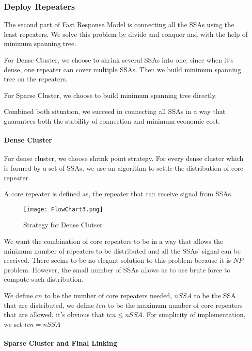 \documentclass[../main]{subfiles}
\begin{document}
\subsubsection{Deploy Repeaters}

The second part of Fast Response Model is connecting all the SSAs using
the least repeaters. We solve this problem by divide and conquer and
with the help of minimum spanning tree.

For Dense Cluster, we choose to shrink several SSAs into one, since when
it's dense, one repeater can cover multiple SSAs. Then we build minimum
spanning tree on the repeaters.

For Sparse Cluster, we choose to build minimum spanning tree directly.

Combined both situation, we succeed in connecting all SSAs in a way that
guarantees both the stability of connection and minimum economic cost.

\paragraph{Dense Cluster}

For dense cluster, we choose shrink point strategy. For every dense
cluster which is formed by a set of SSAs, we use an algorithm to settle
the distribution of core repeater.

A core repeater is defined as, the repeater that can receive signal from
SSAs.

\begin{figure}[h!]
      \texttt{[image: FlowChart3.png]}
      \caption{Strategy for Dense Clutser}
    \end{figure}

We want the combination of core repeaters to be in a way that allows the
minimum number of repeaters to be distributed and all the SSAs' signal
can be received. There seems to be no elegant solution to this problem
because it is \(NP\) problem. However, the small number of SSAs allows
us to use brute force to compute such distribution.

We define \(cn\) to be the number of core repeaters needed, \(nSSA\) to
be the SSA that are distributed, we define \(tcn\) to be the maximum
number of core repeaters that are allowed, it's obvious that
\(tcn \le nSSA\). For simplicity of implementation, we set \(tcn=nSSA\)

\paragraph{Sparse Cluster and Final Linking}
\end{document}
